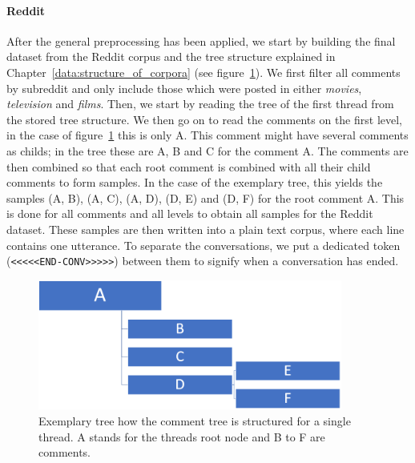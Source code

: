 \paragraph{Reddit} After the general preprocessing has been applied, we start by building the final dataset from the Reddit corpus and the tree structure explained in Chapter~\ref{data:structure_of_corpora} (see figure~\ref{fig:data:reddit:utterance:construction}). We first filter all comments by subreddit and only include those which were posted in either \emph{movies}, \emph{television} and \emph{films}.  Then, we start by reading the tree of the first thread from the stored tree structure. We then go on to read the comments on the first level, in the case of figure~\ref{fig:data:reddit:utterance:construction} this is only A. This comment might have several comments as childs; in the tree these are A, B and C for the comment A. The comments are then combined so that each root comment is combined with all their child comments to form samples. In the case of the exemplary tree, this yields the samples (A, B), (A, C), (A, D), (D, E) and (D, F) for the root comment A. This is done for all comments and all levels to obtain all samples for the Reddit dataset. These samples are then written into a plain text corpus, where each line contains one utterance. To separate the conversations, we put a dedicated token (\texttt{<<<<<END-CONV>>>>>}) between them to signify when a conversation has ended.
\\
\begin{figure}[H]
	\centering
	\includegraphics[width=10cm]{img/reddit_utterance_construction.PNG}
	\caption{Exemplary tree how the comment tree is structured for a single thread. A stands for the threads root node and B to F are comments.}
	\label{fig:data:reddit:utterance:construction}
\end{figure}


